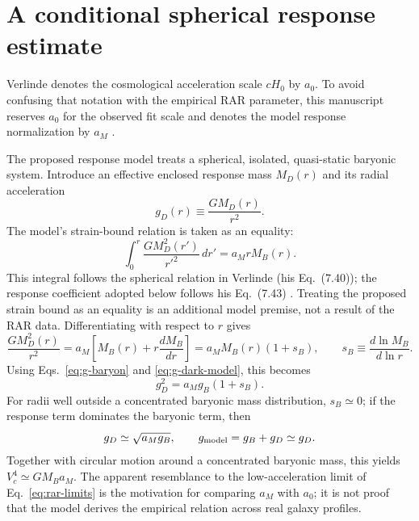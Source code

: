 \documentclass[12pt]{article}
\begin{document}
\section{A conditional spherical response estimate}
\label{sec:response}

Verlinde denotes the cosmological acceleration scale $cH_0$ by $a_0$. To avoid confusing that notation with the empirical RAR parameter, this manuscript reserves $a_0$ for the observed fit scale and denotes the model response normalization by $a_M$ \cite{Verlinde}.

The proposed response model treats a spherical, isolated, quasi-static baryonic system. Introduce an effective enclosed response mass $M_D(r)$ and its radial acceleration
\begin{equation}
  g_D(r)\equiv\frac{GM_D(r)}{r^2}.
  \label{eq:g-dark-model}
\end{equation}
The model's strain-bound relation is taken as an equality:
\begin{equation}
  \int_0^r\frac{G M_D^2(r')}{r'^2}\,dr'
  =a_M r M_B(r).
  \label{eq:strain-integral}
\end{equation}
This integral follows the spherical relation in Verlinde (his Eq.~(7.40)); the response coefficient adopted below follows his Eq.~(7.43) \cite{Verlinde}. Treating the proposed strain bound as an equality is an additional model premise, not a result of the RAR data. Differentiating with respect to $r$ gives
\begin{equation}
  \frac{G M_D^2(r)}{r^2}
  =a_M\left[M_B(r)+r\frac{dM_B}{dr}\right]
  =a_M M_B(r)(1+s_B),
  \qquad
  s_B\equiv\frac{d\ln M_B}{d\ln r}.
  \label{eq:strain-differentiated}
\end{equation}
Using Eqs.~\eqref{eq:g-baryon} and \eqref{eq:g-dark-model}, this becomes
\begin{equation}
  g_D^2=a_Mg_B(1+s_B).
  \label{eq:response-law}
\end{equation}
For radii well outside a concentrated baryonic mass distribution, $s_B\simeq0$; if the response term dominates the baryonic term, then
\begin{equation}
  g_D\simeq\sqrt{a_Mg_B},
  \qquad
  g_{\rm model}=g_B+g_D\simeq g_D.
  \label{eq:outer-response}
\end{equation}
Together with circular motion around a concentrated baryonic mass, this yields $V_c^4\simeq GM_Ba_M$. The apparent resemblance to the low-acceleration limit of Eq.~\eqref{eq:rar-limits} is the motivation for comparing $a_M$ with $a_0$; it is not proof that the model derives the empirical relation across real galaxy profiles.
\end{document}
